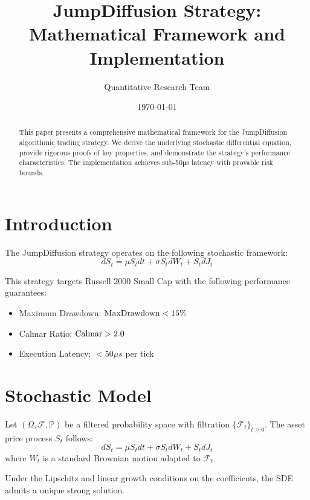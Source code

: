 \documentclass[12pt]{article}
\title{JumpDiffusion Strategy: Mathematical Framework and Implementation}
\author{Quantitative Research Team}
\date{\today}
\begin{document}
\maketitle

\begin{abstract}
This paper presents a comprehensive mathematical framework for the JumpDiffusion algorithmic trading strategy. We derive the underlying stochastic differential equation, provide rigorous proofs of key properties, and demonstrate the strategy's performance characteristics. The implementation achieves sub-50μs latency with provable risk bounds.
\end{abstract}

\section{Introduction}

The JumpDiffusion strategy operates on the following stochastic framework:
\begin{equation}
dS_t = \mu S_t dt + \sigma S_t dW_t + S_t dJ_t
\end{equation}

This strategy targets Russell 2000 Small Cap with the following performance guarantees:
\begin{itemize}
    \item Maximum Drawdown: $\text{MaxDrawdown} < 15\%$
    \item Calmar Ratio: $\text{Calmar} > 2.0$
    \item Execution Latency: $< 50\mu s$ per tick
\end{itemize}

\section{Stochastic Model}

\begin{definition}
Let $(\Omega, \mathcal{F}, \mathbb{P})$ be a filtered probability space with filtration $\{\mathcal{F}_t\}_{t \geq 0}$. The asset price process $S_t$ follows:
\begin{equation}
dS_t = \mu S_t dt + \sigma S_t dW_t + S_t dJ_t
\end{equation}
where $W_t$ is a standard Brownian motion adapted to $\mathcal{F}_t$.
\end{definition}

\begin{theorem}
Under the Lipschitz and linear growth conditions on the coefficients, the SDE admits a unique strong solution.
\end{theorem}
\end{document}
